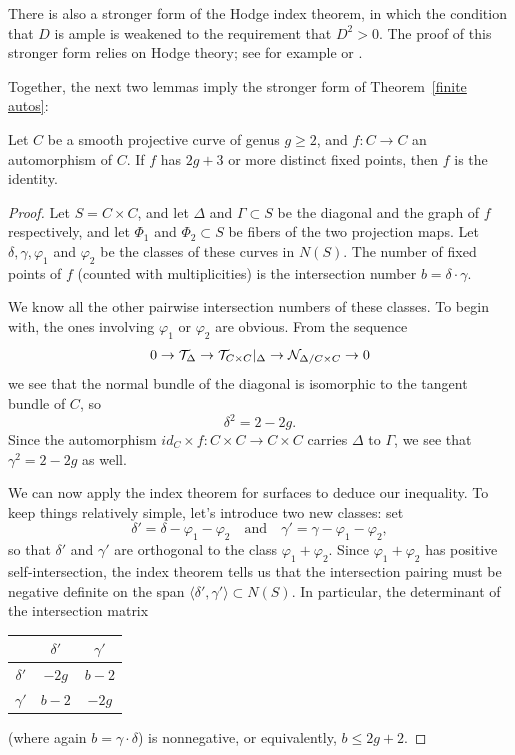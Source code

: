 There is also a stronger form of the Hodge index theorem, in which the
condition that $D$ is ample is weakened to the requirement that $D^2 >
0$. The proof of this stronger form relies on Hodge theory; see for
%
example \cite{MR1997577} or \cite{Griffiths-Harris1978}.

Together, the
next
two lemmas imply the stronger form of
Theorem~\ref{finite autos}:

\begin{lemma}\label{2g+3fixedpoints}
Let $C$ be a smooth projective curve of genus $g \geq 2$, and $f: C \to C$
an automorphism of $C$.
 If $f$ has $2g+3$ or more distinct fixed points, then $f$ is the
 identity.
\end{lemma}

\begin{proof}
Let $S = C\times C$, and let $\Delta$ and $\Gamma \subset S$ be the
diagonal and the graph of $f$ respectively, and let $\Phi_1$ and
$\Phi_2 \subset S$ be fibers of the two projection maps. Let $\delta,
\gamma, \varphi_1$ and $\varphi_2$ be the classes of these curves in
$N(S)$. The number of fixed points of $f$ (counted with multiplicities)
is the intersection number  $b = \delta \cdot \gamma$.

We know all the other pairwise intersection numbers of these
classes. To begin with, the ones involving $\varphi_1$ or $\varphi_2$
are obvious. From the sequence
$$
0\to {\mathcal T}_{\Delta} \to {\mathcal T}_{C\times C}|_{\Delta} \to {\mathcal N}_{\Delta/C\times C}
\to 0
$$
we see that the normal bundle of the diagonal is isomorphic to the
tangent bundle of $C$, so
$$
\delta^2 = 2 - 2g.
$$
Since the automorphism $id_C \times f : C\times C \to C \times C$
carries $\Delta$ to $\Gamma$, we see that $\gamma^2 = 2-2g$ as well.

We can now apply the index theorem for surfaces to deduce our
inequality. To keep things relatively simple, let's introduce two new
classes: set
$$
\delta' = \delta - \varphi_1 - \varphi_2 \quad \text{and} \quad \gamma'
= \gamma - \varphi_1 - \varphi_2,
$$
so that $\delta'$ and $\gamma'$ are orthogonal to the class $\varphi_1 +
\varphi_2$. Since $\varphi_1 + \varphi_2$ has positive self-intersection,
the index theorem  tells us that the intersection pairing must be negative
definite on the span $\langle \delta',\gamma' \rangle \subset N(S)$. In
particular, the determinant of the intersection matrix
\begin{center}
\tabcolsep
\begin{tabular}{c|c@{\hskip\tabcolsep}c}
\downstrut
& $\delta'$ &  $\gamma'$  \\
\hline
\upstrut
$\delta'$ & $-2g$ & $b-2$ \\
$\gamma'$ & $b-2$ & $-2g$
\end{tabular}
\end{center}
(where again $b = \gamma \cdot \delta$) is nonnegative, or equivalently,
$b\leq 2g+2$.
\end{proof}

